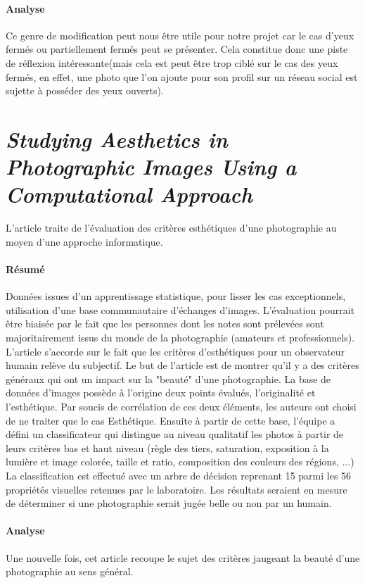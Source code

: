 \documentclass[11pt, french]{report-rd-info}
\begin{document}
\paragraph{Analyse}
Ce genre de modification peut nous être utile pour notre projet car le cas d'yeux fermés ou partiellement fermés peut se présenter. Cela constitue donc une piste de réflexion intéressante(mais cela est peut être trop ciblé sur le cas des yeux fermés, en effet, une photo que l'on ajoute pour son profil sur un réseau social est sujette à posséder des yeux ouverts).


\section{\emph{Studying Aesthetics in Photographic Images Using a Computational Approach}}
L'article \cite{Datta} traite de l'évaluation des critères esthétiques d'une photographie au moyen d'une approche informatique.

\paragraph{Résumé}
Données issues d'un apprentissage statistique, pour lisser les cas exceptionnels, utilisation d'une base communautaire d'échanges d'images. L'évaluation pourrait être biaisée par le fait que les personnes dont les notes sont prélevées sont majoritairement issus du monde de la photographie (amateurs et professionnels). L'article s'accorde sur le fait que les critères d'esthétiques pour un observateur humain relève du subjectif. Le but de l'article est de montrer qu'il y a des critères généraux qui ont un impact sur la "beauté" d'une photographie. La base de données d'images possède à l'origine deux points évalués, l'originalité et l'esthétique. Par soucis de corrélation de ces deux éléments, les auteurs ont choisi de ne traiter que le cas Esthétique.
Ensuite à partir de cette base, l'équipe a défini un classificateur qui distingue au niveau qualitatif les photos à partir de leurs critères bas et haut niveau (règle des tiers, saturation, exposition à la lumière et image colorée, taille et ratio, composition des couleurs des régions, ...)
La classification est effectué avec un arbre de décision reprenant 15 parmi les 56 propriétés visuelles retenues par le laboratoire. Les résultats seraient en mesure de déterminer si une photographie serait jugée belle ou non par un humain. 

\paragraph{Analyse}
Une nouvelle fois, cet article recoupe le sujet des critères jaugeant la beauté d'une photographie au sens général.
\end{document}

